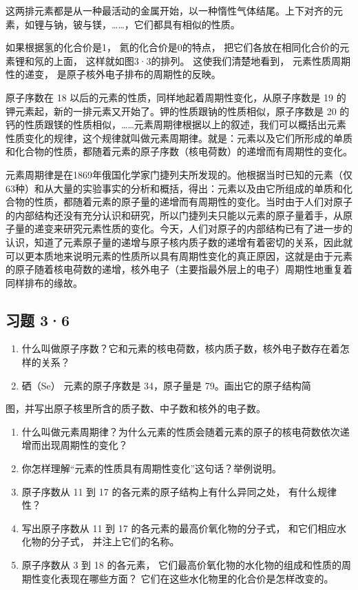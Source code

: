 这两排元素都是从一种最活动的金属开始，以一种惰性气体结尾。上下对齐的元素，如锂与钠，铍与镁，\ldots\ldots，它们都具有相似的性质。

如果根据氢的化合价是1， 氦的化合价是0的特点，
把它们各放在相同化合价的元素锂和氖的上面， 这样就如图3·3的排列。
这使我们清楚地看到， 元素性质周期性的递变，
是原子核外电子排布的周期性的反映。

原子序数在 18 以后的元素的性质，同样地起着周期性变化，从原子序数是 19
的钾元素起，新的一排元素又开始了。钾的性质跟钠的性质相似，原子序数是 20
的钙的性质跟镁的性质相似，\ldots\ldots 元素周期律根据以上的叙述，我们可以概括出元素性质变化的规律，这个规律就叫做元素周期律。就是：元素以及它们所形成的单质和化合物的性质，都随着元素的原子序数（核电荷数）的递增而有周期性的变化。

元素周期律是在1869年俄国化学家门捷列夫所发现的。他根据当时已知的元素（仅63种）和从大量的实验事实的分析和概括，得出：元素以及由它所组成的单质和化合物的性质，都随着元素的原子量的递增而有周期性的变化。当时由于人们对原子的内部结构还没有充分认识和研究，所以门捷列夫只能以元素的原子量着手，从原子量的递变来研究元素性质的变化。今天，人们对原子的内部结构已有了进一步的认识，知道了元素原子量的递增与原子核内质子数的递增有着密切的关系，因此就可以更本质地来说明元素的性质所以具有周期性变化的真正原因，这就是由于元素的原子随着核电荷数的递增，核外电子（主要指最外层上的电子）周期性地重复着同样排布的缘故。

\subsection{习题 3·6}

\begin{enumerate}
\item
  什么叫做原子序数？它和元素的核电荷数，核内质子数，核外电子数存在着怎样的关系？
\item
  硒（Se） 元素的原子序数是 34，原子量是 79。画出它的原子结构简
\end{enumerate}

图，并写出原子核里所含的质子数、中子数和核外的电子数。

\begin{enumerate}[start=3]
\item
  什么叫做元素周期律？为什么元素的性质会随着元素的原子的核电荷数依次递增而出现周期性的变化？
\item
  你怎样理解``元素的性质具有周期性变化''这句话？举例说明。
\item
  原子序数从 11 到 17 的各元素的原子结构上有什么异同之处，
  有什么规律性？
\item
  写出原子序数从 11 到 17 的各元素的最高价氧化物的分子式，
  和它们相应水化物的分子式， 并注上它们的名称。
\item
  原子序数从 3 到 18 的各元素，
  它们最高价氧化物的水化物的组成和性质的周期性变化表现在哪些方面？
  它们在这些水化物里的化合价是怎样改变的。
\end{enumerate}

